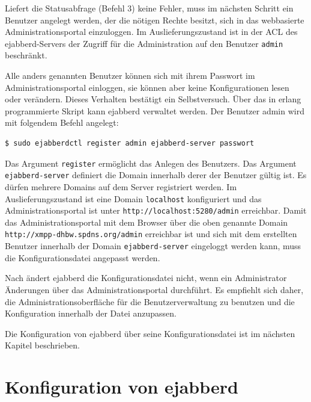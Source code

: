 \documentclass[a4paper,titlepage,halfparskip,12pt]{scrreprt}
\begin{document}
\begin{onehalfspacing}
Liefert die Statusabfrage (Befehl 3) keine Fehler, muss im nächsten Schritt ein Benutzer angelegt werden, der die nötigen Rechte besitzt, sich in das webbasierte Administrationsportal einzuloggen. Im Auslieferungszustand ist in der \ac{ACL} des ejabberd-Servers der Zugriff für die Administration auf den Benutzer \texttt{admin} beschränkt.\cite{ejabberdMGMT}

Alle anders genannten Benutzer können sich mit ihrem Passwort im Administrationsportal einloggen, sie können aber keine Konfigurationen lesen oder verändern. Dieses Verhalten bestätigt ein Selbstversuch. Über das in erlang programmierte Skript kann ejabberd verwaltet werden. Der Benutzer admin wird mit folgendem Befehl angelegt:\cite{ejabberdMGMT}

\bigskip

\begin{lstlisting}[language=bash, caption={Anlegen eines Benutzers für die Verwaltung von ejabberd},label={lst:AddAdminUserEjabberd}]
$ sudo ejabberdctl register admin ejabberd-server passwort
\end{lstlisting}

Das Argument \texttt{register} ermöglicht das Anlegen des Benutzers. Das Argument \texttt{ejabberd-server} definiert die Domain innerhalb derer der Benutzer gültig ist. Es dürfen mehrere Domains auf dem Server registriert werden. Im Auslieferungszustand ist eine Domain \texttt{localhost} konfiguriert und das Administrationsportal ist unter \texttt{http://localhost:5280/admin} erreichbar. Damit das Administrationsportal mit dem Browser über die oben genannte Domain \texttt{http://xmpp-dhbw.spdns.org/admin} erreichbar ist und sich mit dem erstellten Benutzer innerhalb der Domain \texttt{ejabberd-server} eingeloggt werden kann, muss die Konfigurationsdatei angepasst werden.\cite{ejabberdMGMT}

Nach \cite{ejabberdDoc} ändert ejabberd die Konfigurationsdatei nicht, wenn ein Administrator Änderungen über das Administrationsportal durchführt. Es empfiehlt sich daher, die Administrationsoberfläche für die Benutzerverwaltung zu benutzen und die Konfiguration innerhalb der Datei anzupassen.

Die Konfiguration von ejabberd über seine Konfigurationsdatei ist im nächsten Kapitel beschrieben.


\section{Konfiguration von ejabberd}
\label{sec:Konfiguration}


\end{onehalfspacing}
\end{document}

